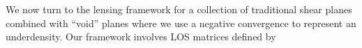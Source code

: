 We now turn to the lensing framework for a collection of traditional shear planes combined with ``void'' planes where we use a negative convergence to represent an underdensity.  Our framework involves LOS matrices defined by
  